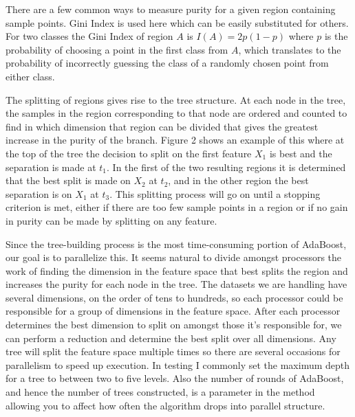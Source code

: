 \documentclass[12pt]{article}
\begin{document}
There are a few common ways to measure purity for a given region containing
sample points. Gini Index is used here which can be easily substituted for
others. For two classes the Gini Index of region $A$ is $I(A) = 2p(1-p)$ where
$p$ is the probability of choosing a point in the first class from $A$, which
translates to the probability of incorrectly guessing the class of a randomly
chosen point from either class.

The splitting of regions gives rise to the tree structure. At each node in the
tree, the samples in the region corresponding to that node are ordered and
counted to find in which dimension that region can be divided that gives the
greatest increase in the purity of the branch. Figure 2 shows an example of
this where at the top of the tree the decision to split on the first feature
$X_1$ is best and the separation is made at $t_1$. In the first of the two
resulting regions it is determined that the best split is made on $X_2$ at
$t_2$, and in the other region the best separation is on $X_1$ at $t_3$. This
splitting process will go on until a stopping criterion is met, either if there
are too few sample points in a region or if no gain in purity can be made by
splitting on any feature.


Since the tree-building process is the most time-consuming portion of AdaBoost,
our goal is to parallelize this. It seems natural to divide amongst processors
the work of finding the dimension in the feature space that best splits the
region and increases the purity for each node in the tree. The datasets we are
handling have several dimensions, on the order of tens to hundreds, so each
processor could be responsible for a group of dimensions in the feature space.
After each processor determines the best dimension to split on amongst those
it's responsible for, we can perform a reduction and determine the best split
over all dimensions. Any tree will split the feature space multiple times so
there are several occasions for parallelism to speed up execution. In testing I
commonly set the maximum depth for a tree to between two to five levels. Also
the number of rounds of AdaBoost, and hence the number of trees constructed, is
a parameter in the method allowing you to affect how often the algorithm drops
into parallel structure.
\end{document}
